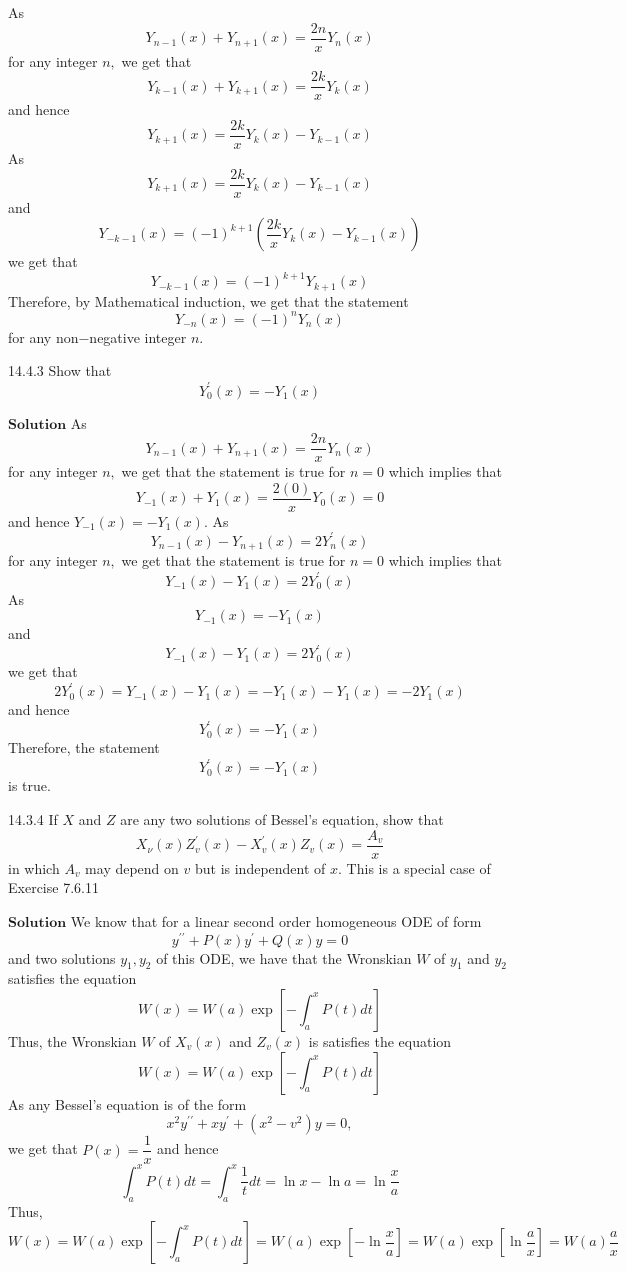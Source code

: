 As 
$$Y_{n-1}(x)+Y_{n+1}(x)=\frac{2 n}{x} Y_{n}(x)$$
for any integer $n,$ we get that 
$$Y_{k-1}(x)+Y_{k+1}(x)=\frac{2 k}{x} Y_{k}(x)$$
and hence 
$$Y_{k+1}(x)=\frac{2 k}{x} Y_{k}(x)-Y_{k-1}(x)$$
As 
$$Y_{k+1}(x)=\frac{2 k}{x} Y_{k}(x)-Y_{k-1}(x)$$
and 
$$Y_{-k-1}(x)=(-1)^{k+1}\left(\frac{2 k}{x} Y_{k}(x)-Y_{k-1}(x)\right)$$ 
we get that
$$Y_{-k-1}(x)=(-1)^{k+1} Y_{k+1}(x)$$
Therefore, by Mathematical induction, we get that the statement 
$$Y_{-n}(x)=(-1)^{n} Y_{n}(x)$$ 
for any non$-$negative integer $n$.



\newpage


\begin{mybox}{14.4.3}
Show that
$$
Y_{0}^{\prime}(x)=-Y_{1}(x)
$$
\end{mybox}
$\boxed{\textbf{Solution}}$ As 
$$Y_{n-1}(x)+Y_{n+1}(x)=\frac{2 n}{x} Y_{n}(x)$$ 
for any integer $n,$ we get that the statement is true for $n=0$ which implies that 
$$Y_{-1}(x)+Y_{1}(x)=\frac{2(0)}{x} Y_{0}(x)=0$$ and hence $Y_{-1}(x)=-Y_{1}(x)$. As 
$$Y_{n-1}(x)-Y_{n+1}(x)=2 Y_{n}^{\prime}(x)$$ 
for any integer $n,$ we get that the statement is true for $n=0$ which implies that 
$$Y_{-1}(x)-Y_{1}(x)=2 Y_{0}^{\prime}(x)$$
As 
$$Y_{-1}(x)=-Y_{1}(x)$$ 
and 
$$Y_{-1}(x)-Y_{1}(x)=2 Y_{0}^{\prime}(x)$$ 
we get that
$$2 Y_{0}^{\prime}(x)=Y_{-1}(x)-Y_{1}(x)=-Y_{1}(x)-Y_{1}(x)=-2 Y_{1}(x)$$ 
and hence 
$$Y_{0}^{\prime}(x)=-Y_{1}(x)$$
Therefore, the statement 
$$Y_{0}^{\prime}(x)=-Y_{1}(x)$$ 
is true.




\newpage




\begin{mybox}{14.3.4}
If $X$ and $Z$ are any two solutions of Bessel's equation, show that
$$
X_{\nu}(x) Z_{v}^{\prime}(x)-X_{v}^{\prime}(x) Z_{v}(x)=\frac{A_{v}}{x}
$$
in which $A_{v}$ may depend on $v$ but is independent of $x$. This is a special case of Exercise 7.6.11
\end{mybox}
$\boxed{\textbf{Solution}}$ We know that for a linear second order homogeneous ODE of form 
$$y^{\prime \prime}+P(x) y^{\prime}+Q(x) y=0$$
and two solutions $y_{1}, y_{2}$ of this ODE, we have that the Wronskian $W$ of $y_{1}$ and $y_{2}$ satisfies the equation 
$$W(x)=W(a) \exp \left[-\int_{a}^{x} P(t) d t\right]$$
Thus, the Wronskian $W$ of $X_{v}(x)$ and $Z_{v}(x)$ is satisfies the equation 
$$W(x)=W(a) \exp \left[-\int_{a}^{x} P(t) d t\right]$$
As any Bessel's equation is of the form 
$$x^{2} y^{\prime \prime}+x y^{\prime}+\left(x^{2}-v^{2}\right) y=0,$$ 
we get that $P(x)=\dfrac{1}{x}$ and hence 
$$\int_{a}^{x} P(t) d t=\int_{a}^{x} \frac{1}{t} d t=\ln x-\ln a=\ln \frac{x}{a}$$
Thus, 
$$W(x)=W(a) \exp \left[-\int_{a}^{x} P(t) d t\right]=W(a) \exp \left[-\ln \frac{x}{a}\right]=W(a) \exp \left[\ln \frac{a}{x}\right]=W(a) \frac{a}{x}$$


